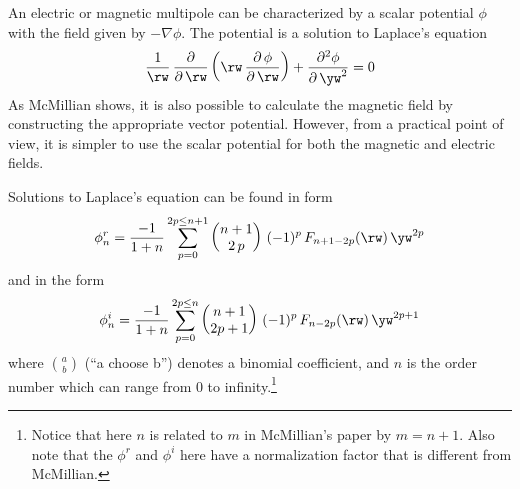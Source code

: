 An electric or magnetic multipole can be characterized by a scalar potential $\phi$ with
the field given by $-\nabla \phi$.  The potential is a solution to Laplace's equation
\begin{equation}
  \frac{1}{\rw} \, \frac{\partial}{\partial \, \rw} 
  \left( \rw \, \frac{\partial \, \phi}{\partial \, \rw} \right) +
  \frac{\partial^2 \phi}{\partial \, \yw^2} = 0
\end{equation}
As McMillian shows, it is also possible to calculate the magnetic field by constructing the
appropriate vector potential. However, from a practical point of view, it is simpler to use the
scalar potential for both the magnetic and electric fields.

Solutions to Laplace's equation can be found in form
\begin{equation}
  \phi_{n}^r = \frac{-1}{1+n} \sum_{p = 0}^{2p \le n+1} 
             \begin{pmatrix} n + 1 \cr 2 \, p \end{pmatrix} \,
             (-1)^{p} \, F_{n+1-2p}(\rw) \, \yw^{2p}
  \label{pspn1}
\end{equation}
and in the form
\begin{equation}
  \phi_{n}^i = \frac{-1}{1+n} \sum_{p = 0}^{2p \le n}
             \begin{pmatrix} n + 1 \cr 2p +1 \end{pmatrix} \,
             (-1)^{p} \, F_{n-2p}(\rw) \, \yw^{2p+1}
  \label{pspn2}
\end{equation}
where $\binom{a}{b}$ (``a choose b'') denotes a binomial coefficient, and $n$ is the order
number which can range from 0 to infinity.\footnote
  { 
Notice that here $n$ is related to $m$ in
McMillian's paper by $m = n + 1$. Also note that the $\phi^r$ and $\phi^i$ here have a
normalization factor that is different from McMillian.
  }

